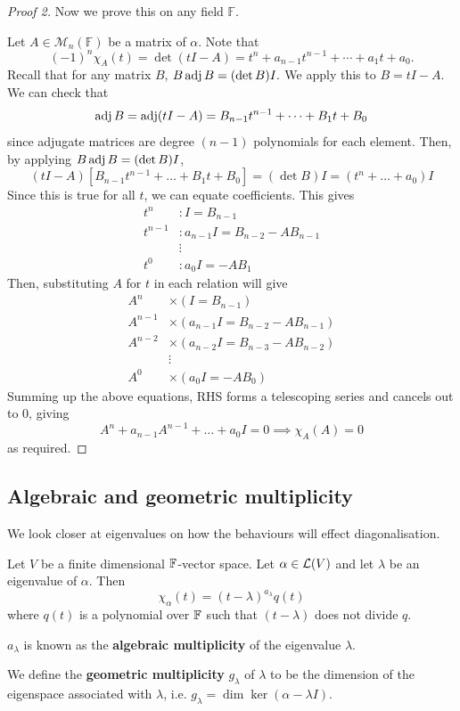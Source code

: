 \documentclass[a4paper]{article}
\begin{document}
\begin{proof}[Proof 2]
	Now we prove this on any field $\mathbb{F}$. 

	Let $ A\in \mathcal{M}_n(\mathbb{F}) $ be a matrix of $\alpha$. Note that 
	\[
		(-1)^n \chi_A(t) = \det (t I - A) = t^n + a_{n-1} t^{n-1} + \cdots + a_1 t + a_0.
 	\]
	Recall that for any matrix $B$, $ B \operatorname{adj} B = (\det B) I. $ We apply this to $B = t I - A$. We can check that
	\[
		\operatorname{adj} B = \operatorname{adj}(tI - A) = B_{n-1} t^{n-1} + \dots + B_1 t + B_0
	\]
	since adjugate matrices are degree $ (n-1) $ polynomials for each element.
	Then, by applying $ B \operatorname{adj} B = (\det B) I $,
	\[
		(tI - A) [ B_{n-1} t^{n-1} + \dots + B_1 t + B_0 ] = (\det B) I = (t^n + \dots + a_0) I
	\]
	Since this is true for all $ t $, we can equate coefficients.
	This gives
	\begin{align*}
		t^n     & :       I          = B_{n-1}            \\
		t^{n-1} & :       a_{n-1} I  = B_{n-2} - AB_{n-1} \\
		        & \vdots                           \\
		t^0     & :       a_0 I      = -A B_1
	\end{align*}
	Then, substituting $ A $ for $ t $ in each relation will give
	\begin{align*}
		A^n & \times (I = B_{n-1}) \\ 
		A^{n-1} & \times (a_{n-1} I = B _{n-2} - AB_{n-1}) \\ 
		A^{n-2} & \times (a_{n-2} I = B_{n-3} - AB_{n-2})\\
		& \vdots \\ 
		A^{0} & \times (a_0 I = - AB_0)
	\end{align*}
	Summing up the above equations, RHS forms a telescoping series and cancels out to $0$, giving
	\[
		A^n + a_{n-1} A^{n-1} + \dots + a_0 I = 0 \implies \chi_A(A) = 0
	\]
	as required. 
\end{proof}

\subsection{Algebraic and geometric multiplicity}
We look closer at eigenvalues on how the behaviours will effect diagonalisation. 
\begin{definition}
	Let $ V $ be a finite dimensional $ {\mathbb{F}} $-vector space.
	Let $ \alpha \in {\mathcal{L}}(V) $ and let $ \lambda $ be an eigenvalue of $ \alpha $.
	Then
	\[
		\chi_\alpha(t) = (t-\lambda)^{a_\lambda} q(t)
	\]
	where $ q(t) $ is a polynomial over $ {\mathbb{F}} $ such that $ (t-\lambda) $ does not divide $ q $.

	$ a_\lambda $ is known as the \textbf{algebraic multiplicity} of the eigenvalue $ \lambda $.
	
	We define the \textbf{geometric multiplicity} $ g_\lambda $ of $ \lambda $ to be the dimension of the eigenspace associated with $ \lambda $, i.e. $ g_\lambda = \dim \ker (\alpha - \lambda I) $.
\end{definition}
\end{document}
